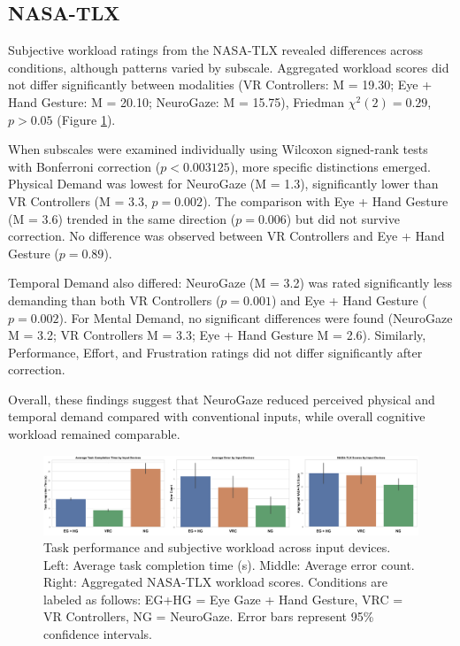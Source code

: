 \documentclass[utf8]{FrontiersinHarvard} %
\begin{document}
\subsection{NASA-TLX}
Subjective workload ratings from the NASA-TLX revealed differences across conditions, although patterns varied by subscale. Aggregated workload scores did not differ significantly between modalities (VR Controllers: M = 19.30; Eye + Hand Gesture: M = 20.10; NeuroGaze: M = 15.75), Friedman $\chi^{2}(2) = 0.29$, $p > 0.05$ (Figure \ref{fig:graphs}).

When subscales were examined individually using Wilcoxon signed-rank tests with Bonferroni correction ($p < 0.003125$), more specific distinctions emerged. Physical Demand was lowest for NeuroGaze (M = 1.3), significantly lower than VR Controllers (M = 3.3, $p = 0.002$). The comparison with Eye + Hand Gesture (M = 3.6) trended in the same direction ($p = 0.006$) but did not survive correction. No difference was observed between VR Controllers and Eye + Hand Gesture ($p = 0.89$).

Temporal Demand also differed: NeuroGaze (M = 3.2) was rated significantly less demanding than both VR Controllers ($p = 0.001$) and Eye + Hand Gesture ($p = 0.002$).
For Mental Demand, no significant differences were found (NeuroGaze M = 3.2; VR Controllers M = 3.3; Eye + Hand Gesture M = 2.6). Similarly, Performance, Effort, and Frustration ratings did not differ significantly after correction.

Overall, these findings suggest that NeuroGaze reduced perceived physical and temporal demand compared with conventional inputs, while overall cognitive workload remained comparable.

\begin{figure}[ht]
\begin{center}
\includegraphics[width=17cm]{figures/graphs.png}
\end{center}
\caption{Task performance and subjective workload across input devices. 
Left: Average task completion time (s). 
Middle: Average error count. 
Right: Aggregated NASA-TLX workload scores. 
Conditions are labeled as follows: EG+HG = Eye Gaze + Hand Gesture, VRC = VR Controllers, NG = NeuroGaze. 
Error bars represent 95\% confidence intervals.}
\label{fig:graphs}
\end{figure}
\end{document}
